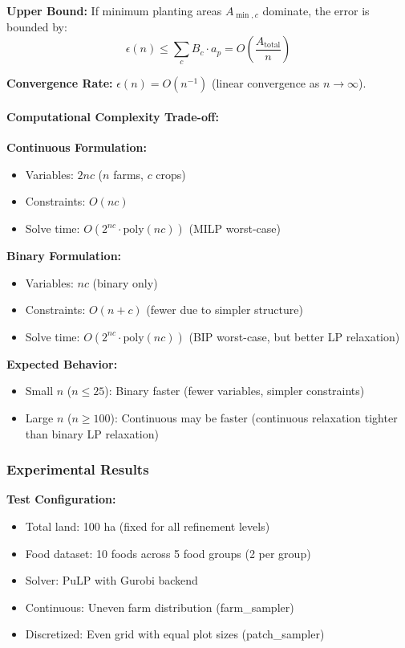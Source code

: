\documentclass{article}
\begin{document}
\textbf{Upper Bound:} If minimum planting areas $A_{\min,c}$ dominate, the error is bounded by:
$$\epsilon(n) \leq \sum_c B_c \cdot a_p = O\left(\frac{A_{\text{total}}}{n}\right)$$

\textbf{Convergence Rate:} $\epsilon(n) = O(n^{-1})$ (linear convergence as $n \to \infty$).

\paragraph{Computational Complexity Trade-off:}

\textbf{Continuous Formulation:}
\begin{itemize}
    \item Variables: $2nc$ ($n$ farms, $c$ crops)
    \item Constraints: $O(nc)$
    \item Solve time: $O(2^{nc} \cdot \text{poly}(nc))$ (MILP worst-case)
\end{itemize}

\textbf{Binary Formulation:}
\begin{itemize}
    \item Variables: $nc$ (binary only)
    \item Constraints: $O(n + c)$ (fewer due to simpler structure)
    \item Solve time: $O(2^{nc} \cdot \text{poly}(nc))$ (BIP worst-case, but better LP relaxation)
\end{itemize}

\textbf{Expected Behavior:}
\begin{itemize}
    \item Small $n$ ($n \leq 25$): Binary faster (fewer variables, simpler constraints)
    \item Large $n$ ($n \geq 100$): Continuous may be faster (continuous relaxation tighter than binary LP relaxation)
\end{itemize}

\subsubsection{Experimental Results}

\textbf{Test Configuration:}
\begin{itemize}
    \item Total land: 100 ha (fixed for all refinement levels)
    \item Food dataset: 10 foods across 5 food groups (2 per group)
    \item Solver: PuLP with Gurobi backend
    \item Continuous: Uneven farm distribution (farm\_sampler)
    \item Discretized: Even grid with equal plot sizes (patch\_sampler)
\end{itemize}
\end{document}
